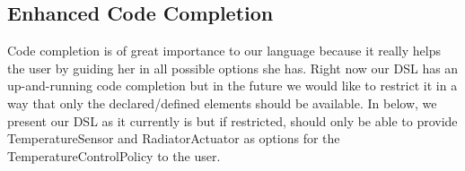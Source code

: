 \subsection{Enhanced Code Completion}\label{subsec:codecompletion}
Code completion is of great importance to our language because it really helps the user by guiding her in all possible options she has. Right now our DSL has an up-and-running code completion but in the future we would like to restrict it in a way that only the declared/defined elements should be available. In  below, we present our DSL as it currently is but if restricted, should only be able to provide TemperatureSensor and RadiatorActuator as options for the TemperatureControlPolicy to the user.

